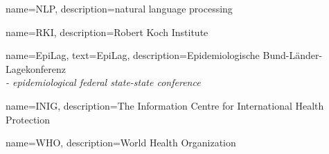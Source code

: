 \RequirePackage{amsthm}
\theoremstyle{definition}
\newtheorem{definition}{Definition}[chapter]
\newtheorem{example}{Example}[chapter]




\RequirePackage[small,bf]{caption}




\RequirePackage{subfig}





\graphicspath{{./Figures/}}









{
  name={NLP},
  description={natural language processing}
}

{
  name={RKI},
  description={Robert Koch Institute}
}

{
  name={EpiLag},
  text={EpiLag},
  description={Epidemiologische Bund-L\"ander-Lagekonferenz \\
               \textit{- epidemiological federal state-state conference}}
}

{
  name={INIG},
  description={The Information Centre for International Health Protection}
}

{
  name={WHO},
  description={World Health Organization}
}

